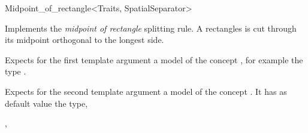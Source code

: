 

\begin{ccRefFunctionObjectClass}{Midpoint_of_rectangle<Traits, SpatialSeparator>}


\ccDefinition
Implements the {\em midpoint of rectangle} splitting rule.
A rectangles is cut through its midpoint orthogonal to the longest side.


\ccParameters

Expects for the first template argument a model of
the concept , for example
the type . 

Expects for the second template argument a model of the concept . It has as default value
the type, 


\ccIsModel



\ccCreation
{}  %


\ccSeeAlso

,\\

\end{ccRefFunctionObjectClass}





